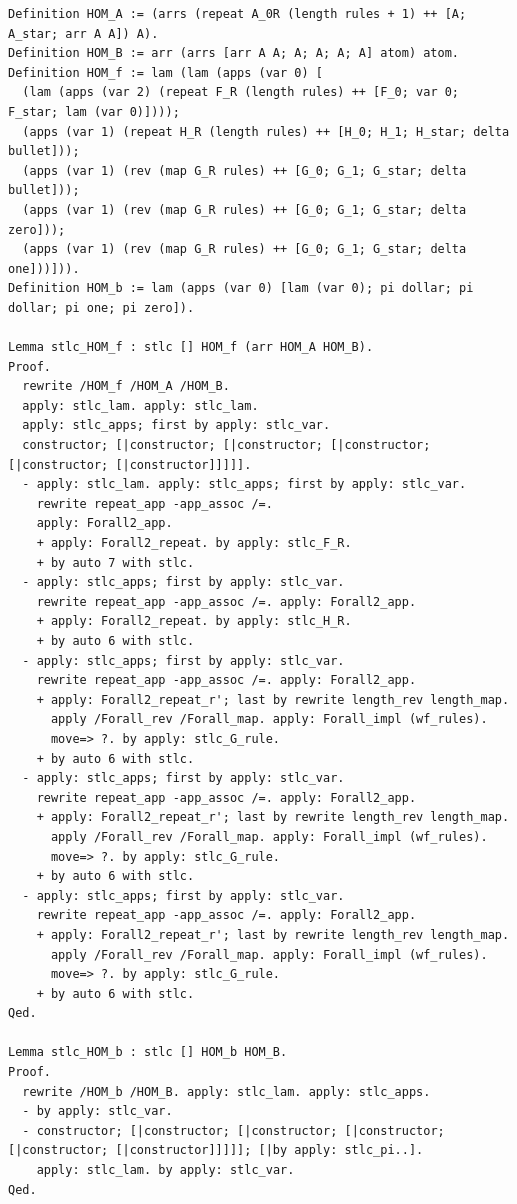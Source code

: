 \documentclass[10pt,a4paper]{amsart}
\begin{document}
\begin{lstlisting}
Definition HOM_A := (arrs (repeat A_0R (length rules + 1) ++ [A; A_star; arr A A]) A).
Definition HOM_B := arr (arrs [arr A A; A; A; A; A] atom) atom.
Definition HOM_f := lam (lam (apps (var 0) [
  (lam (apps (var 2) (repeat F_R (length rules) ++ [F_0; var 0; F_star; lam (var 0)])));
  (apps (var 1) (repeat H_R (length rules) ++ [H_0; H_1; H_star; delta bullet]));
  (apps (var 1) (rev (map G_R rules) ++ [G_0; G_1; G_star; delta bullet]));
  (apps (var 1) (rev (map G_R rules) ++ [G_0; G_1; G_star; delta zero]));
  (apps (var 1) (rev (map G_R rules) ++ [G_0; G_1; G_star; delta one]))])).
Definition HOM_b := lam (apps (var 0) [lam (var 0); pi dollar; pi dollar; pi one; pi zero]).

Lemma stlc_HOM_f : stlc [] HOM_f (arr HOM_A HOM_B).
Proof.
  rewrite /HOM_f /HOM_A /HOM_B.
  apply: stlc_lam. apply: stlc_lam.
  apply: stlc_apps; first by apply: stlc_var.
  constructor; [|constructor; [|constructor; [|constructor; [|constructor; [|constructor]]]]].
  - apply: stlc_lam. apply: stlc_apps; first by apply: stlc_var.
    rewrite repeat_app -app_assoc /=.
    apply: Forall2_app.
    + apply: Forall2_repeat. by apply: stlc_F_R.
    + by auto 7 with stlc.
  - apply: stlc_apps; first by apply: stlc_var.
    rewrite repeat_app -app_assoc /=. apply: Forall2_app.
    + apply: Forall2_repeat. by apply: stlc_H_R.
    + by auto 6 with stlc.
  - apply: stlc_apps; first by apply: stlc_var.
    rewrite repeat_app -app_assoc /=. apply: Forall2_app.
    + apply: Forall2_repeat_r'; last by rewrite length_rev length_map.
      apply /Forall_rev /Forall_map. apply: Forall_impl (wf_rules).
      move=> ?. by apply: stlc_G_rule.
    + by auto 6 with stlc.
  - apply: stlc_apps; first by apply: stlc_var.
    rewrite repeat_app -app_assoc /=. apply: Forall2_app.
    + apply: Forall2_repeat_r'; last by rewrite length_rev length_map.
      apply /Forall_rev /Forall_map. apply: Forall_impl (wf_rules).
      move=> ?. by apply: stlc_G_rule.
    + by auto 6 with stlc.
  - apply: stlc_apps; first by apply: stlc_var.
    rewrite repeat_app -app_assoc /=. apply: Forall2_app.
    + apply: Forall2_repeat_r'; last by rewrite length_rev length_map.
      apply /Forall_rev /Forall_map. apply: Forall_impl (wf_rules).
      move=> ?. by apply: stlc_G_rule.
    + by auto 6 with stlc.
Qed.

Lemma stlc_HOM_b : stlc [] HOM_b HOM_B.
Proof.
  rewrite /HOM_b /HOM_B. apply: stlc_lam. apply: stlc_apps.
  - by apply: stlc_var.
  - constructor; [|constructor; [|constructor; [|constructor; [|constructor; [|constructor]]]]]; [|by apply: stlc_pi..].
    apply: stlc_lam. by apply: stlc_var.
Qed.


\end{lstlisting}
\end{document}
